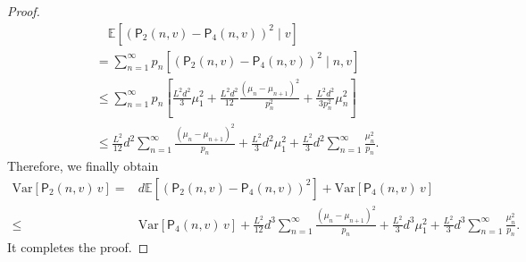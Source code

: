 \documentclass[10pt,a4paper]{amsart}
\newcommand{\EE}{\mathbb{E}}
\newcommand{\Var}{\mathrm{Var}}
\newcommand{\sfP}{\mathsf{P}}
\begin{document}
\begin{proof}
    \begin{align*}
        &\quad \EE[ (\mathsf{P}_2(n, v) - \mathsf{P}_4(n, v))^2\mid  v] \\
        &= \sum_{n=1}^\infty p_n [ (\mathsf{P}_2(n, v) - \mathsf{P}_4(n, v))^2\mid  n, v] \\ 
        &\leq \sum_{n=1}^\infty p_n \left[ \frac{L^2 d^2}{3}\mu_1^2 + \frac{L^2 d^2}{12}\frac{(\mu_n-\mu_{n+1})^2}{p_n^2} + \frac{L^2 d^2}{3 p_n^2} \mu_{n}^2\right]  \\
        &\leq \frac{L^2}{12}  d^2\sum_{n=1}^\infty \frac{(\mu_n - \mu_{n+1})^2}{p_n} + \frac{L^2 }{3} d^2\mu_1^2 + \frac{L^2}{3} d^2 \sum_{n=1}^\infty \frac{\mu_n^2}{p_n}.
    \end{align*}
    Therefore, we finally obtain
\begin{align*}
    \Var[\sfP_2(n,v) \, v ]  = & d\EE[(\sfP_2(n,v)- \sfP_4(n,v))^2  ] + \Var[\sfP_4(n,v)\, v] \\ 
    \leq & \Var[\sfP_4(n,v)\, v] + \frac{L^2}{12}  d^3\sum_{n=1}^\infty \frac{(\mu_n - \mu_{n+1})^2}{p_n} + \frac{L^2 }{3} d^3\mu_1^2 + \frac{L^2}{3} d^3 \sum_{n=1}^\infty \frac{\mu_n^2}{p_n}.
\end{align*}
It completes the proof. 
\end{proof}
\end{document}
